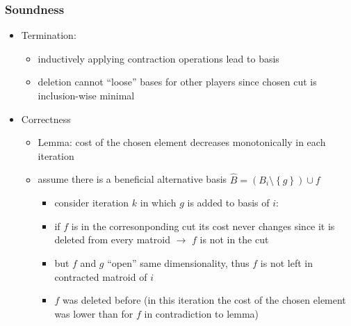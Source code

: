 \documentclass{beamer}
\newcommand{\set}[1]{\left\{#1\right\}}
\begin{document}
\begin{frame}
  \frametitle{Soundness}
  \begin{itemize}
    \item Termination:
      \begin{itemize}
        \item<2-> inductively applying contraction operations lead to basis
        \item<3-> deletion cannot \enquote{loose} bases for other players since
          chosen cut is inclusion-wise minimal
      \end{itemize}
    \item Correctness
      \begin{itemize}
        \item<4-> Lemma: cost of the chosen element decreases monotonically in each
          iteration
        \item<5-> assume there is a beneficial alternative basis
          $\hat{B} = (B_{i}\setminus\set{g})\cup{f}$
          \begin{itemize}
            \item<6-> consider iteration $k$ in which $g$ is added to basis of $i$:
            \item<7-> if $f$ is in the corresonponding cut its cost never changes
              since it is deleted from every matroid $\rightarrow$ $f$ is not
              in the cut
            \item<8-> but $f$ and $g$ \enquote{open} same dimensionality, thus $f$
              is not left in contracted matroid of $i$
            \item<9-> $f$ was deleted before (in this iteration the cost of the
              chosen element was lower than for $f$ in contradiction to lemma)
          \end{itemize}
      \end{itemize}
  \end{itemize}
\end{frame}
\end{document}
